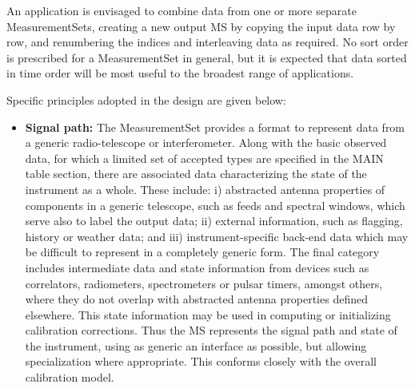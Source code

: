 \documentclass{article}
\begin{document}
\begin{itemize}
{ An application is envisaged to combine data from one or more
separate MeasurementSets, creating a new output MS by copying the
input data row by row, and renumbering the indices and interleaving
data as required. No sort order is prescribed for a MeasurementSet in
general, but it is expected that data sorted in time order will be
most useful to the broadest range of applications.}

\end{itemize}

Specific principles adopted in the design are given below:

\begin{itemize}

\item{{\bf Signal path:} The MeasurementSet provides a format to
represent data from a generic radio-telescope or interferometer. Along
with the basic observed data, for which a limited set of accepted
types are specified in the MAIN table section, there are associated
data characterizing the state of the instrument as a whole. These
include: i) abstracted antenna properties of components in a generic
telescope, such as feeds and spectral windows, which serve also to
label the output data; ii) external information, such as flagging,
history or weather data; and iii) instrument-specific back-end data
which may be difficult to represent in a completely generic form. The
final category includes intermediate data and state information from
devices such as correlators, radiometers, spectrometers or pulsar
timers, amongst others, where they do not overlap with abstracted
antenna properties defined elsewhere. This state information may be
used in computing or initializing calibration corrections. Thus the MS
represents the signal path and state of the instrument, using as
generic an interface as possible, but allowing specialization where
appropriate. This conforms closely with the overall calibration
model.}


\end{itemize}
\end{document}
